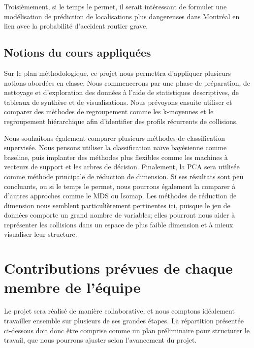 \documentclass[10pt]{article}
\begin{document}
Troisièmement, si le temps le permet, il serait intéressant de formuler une modélisation de prédiction de localisations plus dangereuses dans Montréal en lien avec la probabilité d'accident routier grave.

\subsection{Notions du cours appliquées}
Sur le plan méthodologique, ce projet nous permettra d’appliquer plusieurs notions abordées en classe. Nous commencerons par une phase de préparation, de nettoyage et d’exploration des données à l’aide de statistiques descriptives, de tableaux de synthèse et de visualisations. Nous prévoyons ensuite utiliser et comparer des méthodes de regroupement comme les k-moyennes et le regroupement hiérarchique afin d’identifier des profils récurrents de collisions.

Nous souhaitons également comparer plusieurs méthodes de classification supervisée. Nous pensons utiliser la classification naïve bayésienne comme baseline, puis implanter des méthodes plus flexibles comme les machines à vecteurs de support et les arbres de décision. Finalement, la PCA sera utilisée comme méthode principale de réduction de dimension. Si ses résultats sont peu concluants, ou si le temps le permet, nous pourrons également la comparer à d’autres approches comme le MDS ou Isomap. Les méthodes de réduction de dimension nous semblent particulièrement pertinentes ici, puisque le jeu de données comporte un grand nombre de variables; elles pourront nous aider à représenter les collisions dans un espace de plus faible dimension et à mieux visualiser leur structure.
\section{Contributions prévues de chaque membre de l'équipe}

Le projet sera réalisé de manière collaborative, et nous comptons idéalement travailler ensemble sur plusieurs de ses grandes étapes. La répartition présentée ci-dessous doit donc être comprise comme un plan préliminaire pour structurer le travail, que nous pourrons ajuster selon l’avancement du projet.
\end{document}

